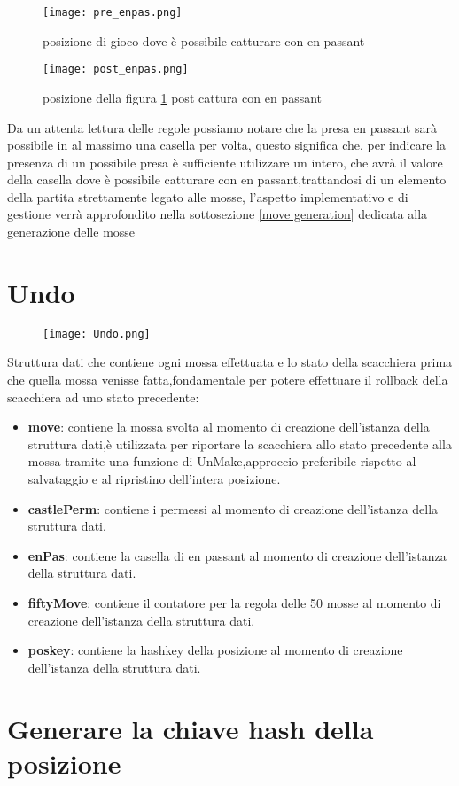 \begin{figure}[H]
    \centering
    \begin{minipage}[t]{0.4\textwidth}
        \texttt{[image: pre\_enpas.png]}
        \caption{posizione di gioco dove è possibile catturare con en passant}
        \label{pre_enpas}
    \end{minipage}
    \hfill
    \begin{minipage}[t]{0.4\textwidth}
        \texttt{[image: post\_enpas.png]}
        \caption{posizione della figura \ref{pre_enpas} post cattura con en passant}
    \end{minipage}
\end{figure}
Da un attenta lettura delle regole possiamo notare che la presa en passant sarà possibile in al massimo una casella per volta,
questo significa che, per indicare la presenza di un possibile presa è sufficiente utilizzare un intero, che avrà il valore della casella dove è
possibile catturare con en passant,trattandosi di un elemento della partita strettamente legato alle mosse, l'aspetto implementativo e di gestione verrà approfondito nella sottosezione \ref{move generation} dedicata alla generazione delle mosse


\section{Undo}
\label{undo}
\begin{figure}[H]
    \centering
    \texttt{[image: Undo.png]}
\end{figure}
Struttura dati che contiene ogni mossa effettuata e lo stato della scacchiera prima che quella mossa venisse fatta,fondamentale per potere effettuare
il rollback della scacchiera ad uno stato precedente:
\begin{itemize}
    \item   \textbf{move}: contiene la mossa svolta al momento di creazione dell'istanza della struttura dati,è utilizzata per riportare la scacchiera allo stato precedente alla mossa tramite una funzione di UnMake,approccio preferibile rispetto al salvataggio e al ripristino dell'intera posizione.
    \item   \textbf{castlePerm}: contiene i permessi al momento di creazione dell'istanza della struttura dati.
    \item   \textbf{enPas}: contiene la casella di en passant al momento di creazione dell'istanza della struttura dati.
    \item   \textbf{fiftyMove}: contiene il contatore per la regola delle 50 mosse al momento di creazione dell'istanza della struttura dati.
    \item   \textbf{poskey}: contiene la hashkey della posizione al momento di creazione dell'istanza della struttura dati.
\end{itemize}


\section{Generare la chiave hash della posizione}